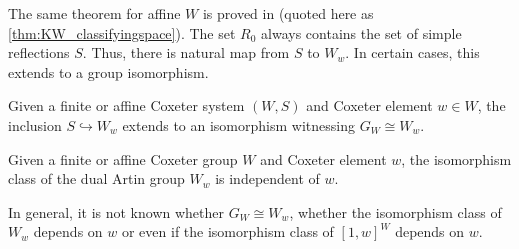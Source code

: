 \documentclass[class=article, crop=false]{standalone}
\begin{document}
The same theorem for affine $W$ is proved in \cite{paolini_salvetti_kpi1_2021} (quoted here as \cref{thm:KW_classifyingspace}). The set $R_0$ always contains the set of simple reflections $S$. Thus, there is natural map from $S$ to $W_w$. In certain cases, this extends to a group isomorphism.

\begin{theorem}
    Given a finite \cite[Theorem 2.2.5]{bessis_dual_2003} or affine \cite[Theorem C]{mccammond_sulway_artin_2017} Coxeter system $(W,S)$ and Coxeter element $w \in W$, the inclusion $S \hookrightarrow W_w$ extends to an isomorphism witnessing $G_W \cong W_w$.
    \label{thm:dual_artin_iso_artin}
\end{theorem}
\begin{corollary}
    Given a finite or affine Coxeter group $W$ and Coxeter element $w$, the isomorphism class of the dual Artin group $W_w$ is independent of $w$.
\end{corollary}

In general, it is not known whether $G_W \cong W_w$, whether the isomorphism class of $W_w$ depends on $w$ or even if the isomorphism class of $[1,w]^W$ depends on $w$.
\end{document}
